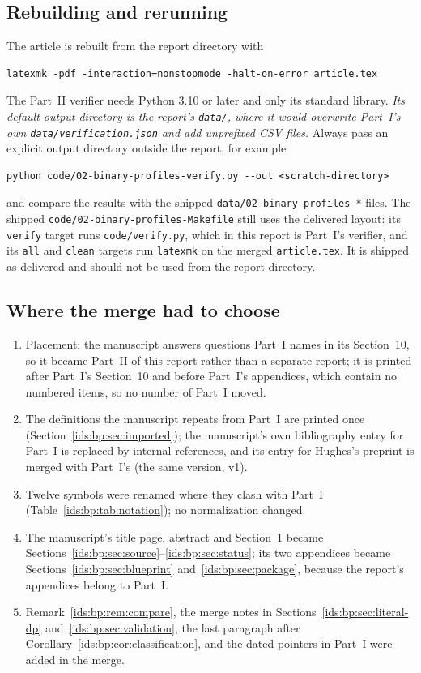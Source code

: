 \documentclass[11pt,letterpaper]{article}
\theoremstyle{definition}\newtheorem{definition}[theorem]{Definition}
\theoremstyle{remark}\newtheorem{remark}[theorem]{Remark}
\theoremstyle{definition}\newtheorem{question}[theorem]{Question}
\begin{document}
\subsection{Rebuilding and rerunning}
The article is rebuilt from the report directory with
\begin{lstlisting}
latexmk -pdf -interaction=nonstopmode -halt-on-error article.tex
\end{lstlisting}
The Part~II verifier needs Python 3.10 or later and only its standard
library. \emph{Its default output directory is the report's \texttt{data/},
where it would overwrite Part~I's own \texttt{data/verification.json} and add
unprefixed CSV files.} Always pass an explicit output directory outside the
report, for example
\begin{lstlisting}
python code/02-binary-profiles-verify.py --out <scratch-directory>
\end{lstlisting}
and compare the results with the shipped
\nolinkurl{data/02-binary-profiles-*} files. The shipped
\nolinkurl{code/02-binary-profiles-Makefile} still uses the delivered layout: its
\texttt{verify} target runs \texttt{code/verify.py}, which in this report is
Part~I's verifier, and its \texttt{all} and \texttt{clean} targets run
\texttt{latexmk} on the merged \texttt{article.tex}. It is shipped as
delivered and should not be used from the report directory.

\subsection{Where the merge had to choose}
\begin{enumerate}[nosep]
\item Placement: the manuscript answers questions Part~I names in its
Section~10, so it became Part~II of this report rather than a separate
report; it is printed after Part~I's Section~10 and before Part~I's
appendices, which contain no numbered items, so no number of Part~I moved.
\item The definitions the manuscript repeats from Part~I are printed once
(Section~\ref{ids:bp:sec:imported}); the manuscript's own bibliography entry
for Part~I is replaced by internal references, and its entry for Hughes's
preprint is merged with Part~I's (the same version, v1).
\item Twelve symbols were renamed where they clash with Part~I
(Table~\ref{ids:bp:tab:notation}); no normalization changed.
\item The manuscript's title page, abstract and Section~1 became
Sections~\ref{ids:bp:sec:source}--\ref{ids:bp:sec:status}; its two appendices
became Sections~\ref{ids:bp:sec:blueprint} and~\ref{ids:bp:sec:package},
because the report's appendices belong to Part~I.
\item Remark~\ref{ids:bp:rem:compare}, the merge notes in
Sections~\ref{ids:bp:sec:literal-dp} and~\ref{ids:bp:sec:validation}, the
last paragraph after Corollary~\ref{ids:bp:cor:classification}, and the dated
pointers in Part~I were added in the merge.
\end{enumerate}
\end{document}
